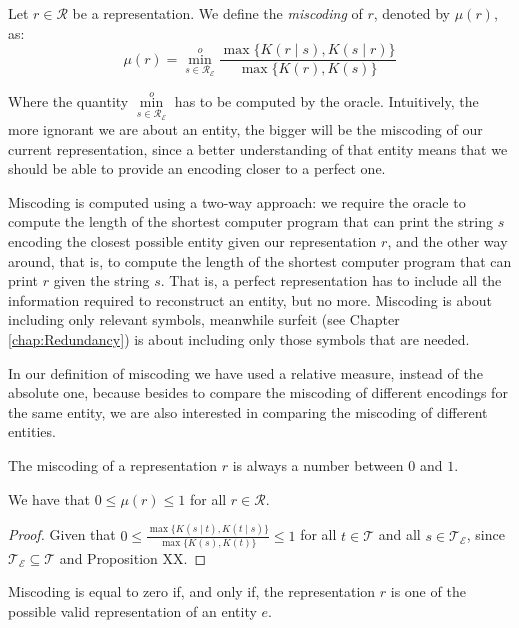 \begin{definition} [Miscoding]
\label{def:miscoding}
Let $r \in \mathcal{R}$ be a representation. We define the \emph{miscoding} of $r$, denoted by $\mu(r)$, as:
\[
\mu(r) = \overset{o}{ \underset{s \in \mathcal{R}_\mathcal{E}} \min} \frac{ \max\{ K(r \mid s), K(s \mid r) \} } { \max\{ K(r), K(s) \} }
\]
\end{definition}

Where the quantity $\overset{o}{ \underset{s \in \mathcal{R}_\mathcal{E}} \min}$ has to be computed by the oracle. Intuitively, the more ignorant we are about an entity, the bigger will be the miscoding of our current representation, since a better understanding of that entity means that we should be able to provide an encoding closer to a perfect one.

Miscoding is computed using a two-way approach: we require the oracle to compute the length of the shortest computer program that can print the string $s$ encoding the closest possible entity given our representation $r$, and the other way around, that is, to compute the length of the shortest computer program that can print $r$ given the string $s$. That is, a perfect representation has to include all the information required to reconstruct an entity, but no more. Miscoding is about including only relevant symbols, meanwhile surfeit (see Chapter \ref{chap:Redundancy}) is about including only those symbols that are needed.

In our definition of miscoding we have used a relative measure, instead of the absolute one, because besides to compare the miscoding of different encodings for the same entity, we are also interested in comparing the miscoding of different entities.

The miscoding of a representation $r$ is always a number between $0$ and $1$.

\begin{proposition}
\label{prop:range_miscoding}
We have that $0 \leq \mu(r) \leq 1$ for all $r \in \mathcal{R}$.
\end{proposition}
\begin{proof}
Given that $0 \leq \frac{ \max\{ K(s \mid t), K(t \mid s) \} } { \max\{ K(s), K(t) \} } \leq 1$ for all $t \in \mathcal{T}$ and all $s \in \mathcal{T}_\mathcal{E}$, since $\mathcal{T}_\mathcal{E} \subseteq \mathcal{T}$ and Proposition {\color{red} XX}.
\end{proof}

Miscoding is equal to zero if, and only if, the representation $r$ is one of the possible valid representation of an entity $e$.

